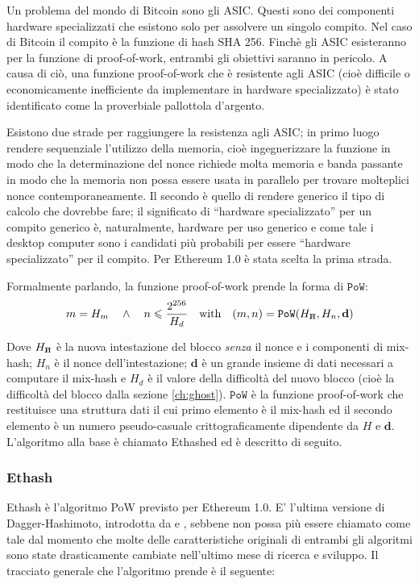 \documentclass[9pt,oneside]{amsart}
\newcommand{\hcancel}[1]{%
    \tikz[baseline=(tocancel.base)]{
        \node[inner sep=0pt,outer sep=0pt] (tocancel) {#1};
        \draw[black] (tocancel.south west) -- (tocancel.north east);
    }%
}%
\begin{document}
\begin{multicols}{2}
Un problema del mondo di Bitcoin sono gli ASIC. Questi sono dei componenti hardware specializzati che esistono solo per assolvere un singolo compito. Nel caso di Bitcoin il compito è la funzione di hash SHA 256. Finchè gli ASIC esisteranno per la funzione di proof-of-work, entrambi gli obiettivi saranno in pericolo. A causa di ciò, una funzione proof-of-work che è resistente agli ASIC (cioè difficile o economicamente inefficiente da implementare in hardware specializzato) è stato identificato come la proverbiale pallottola d'argento.

Esistono due strade per raggiungere la resistenza agli ASIC; in primo luogo rendere sequenziale l'utilizzo della memoria, cioè ingegnerizzare la funzione in modo che la determinazione del nonce richiede molta memoria e banda passante in modo che la memoria non possa essere usata in parallelo per trovare molteplici nonce contemporaneamente. Il secondo è quello di rendere generico il tipo di calcolo che dovrebbe fare; il significato di ``hardware specializzato'' per un compito generico è, naturalmente, hardware per uso generico e come tale i desktop computer sono i candidati più probabili per essere ``hardware specializzato'' per il compito. Per Ethereum 1.0 è stata scelta la prima strada.

Formalmente parlando, la funzione proof-of-work prende la forma di $\mathtt{PoW}$:
\begin{equation}
m = H_m \quad \wedge \quad n \leqslant \frac{2^{256}}{H_d} \quad \text{with} \quad (m, n) = \mathtt{PoW}(H_{\hcancel{n}}, H_n, \mathbf{d})
\end{equation}

Dove $H_{\hcancel{n}}$ è la nuova intestazione del blocco \textit{senza} il nonce e i componenti di mix-hash; $H_n$ è il nonce dell'intestazione; $\mathbf{d}$ è un grande insieme di dati necessari a computare il mix-hash e $H_d$ è il valore della difficoltà del nuovo blocco (cioè la difficoltà del blocco dalla sezione \ref{ch:ghost}). $\mathtt{PoW}$ è la funzione proof-of-work che restituisce  una struttura dati il cui primo elemento è il mix-hash ed il secondo elemento è un numero pseudo-casuale crittograficamente dipendente da $H$ e $\mathbf{d}$. L'algoritmo alla base è chiamato Ethashed ed è descritto di seguito.
\subsubsection{Ethash}
Ethash è l'algoritmo PoW previsto per Ethereum 1.0. E' l'ultima versione di Dagger-Hashimoto, introdotta da \cite{dagger} e \cite{hashimoto}, sebbene non possa più essere chiamato come tale dal momento che molte delle caratteristiche originali di entrambi gli algoritmi sono state drasticamente cambiate nell'ultimo mese di ricerca e sviluppo. Il tracciato generale che l'algoritmo prende è il seguente:


\end{multicols}
\end{document}
